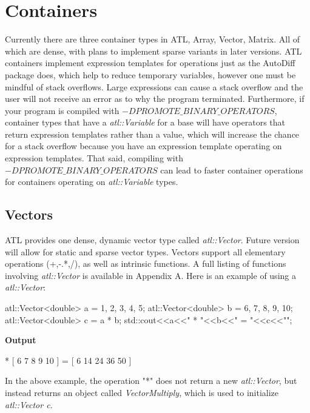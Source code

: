 \documentclass[12pt,a4paper]{article}
\begin{document}
\section{Containers}
Currently there are three container types in ATL, Array, Vector, Matrix. All of which are dense, with plans to implement sparse variants in later versions. ATL containers implement expression templates for operations just as the AutoDiff package does, which help to reduce temporary variables, however one must be mindful of stack overflows. Large expressions can cause a stack overflow and the user will not receive an error as to why the program terminated. Furthermore, if your program is compiled with \textit{$-DPROMOTE\_BINARY\_OPERATORS$}, container types that have a \textit{atl::Variable} for a base will have operators that return expression templates rather than a value, which will increase the chance for a stack overflow because you have an expression template operating on expression templates. That said, compiling with \textit{$-DPROMOTE\_BINARY\_OPERATORS$} can lead to faster container operations for containers operating on \textit{atl::Variable} types.
\subsection{Vectors}
ATL provides one dense, dynamic vector type called \textit{atl::Vector}. Future version will allow for static and sparse vector types. Vectors support all elementary operations (+,-.*,/), as well as intrinsic functions. A full listing of functions involving \textit{atl::Vector} is available in Appendix A. Here is an example of using a \textit{atl::Vector}:
\begin{cppsource}

    atl::Vector<double> a = {1, 2, 3, 4, 5};
    atl::Vector<double> b = {6, 7, 8, 9, 10};
    atl::Vector<double> c = a * b;
    std::cout<<a<<" * "<<b<<" = "<<c<<"\n";
  
\end{cppsource}
\textbf{Output}
\begin{myoutput}
[ 1 2 3 4 5 ] * [ 6 7 8 9 10 ] = [ 6 14 24 36 50 ]
\end{myoutput}
In the above example, the operation "*" does not return a new \textit{atl::Vector}, but instead returns an object called \textit{VectorMultiply}, which is used to initialize \textit{atl::Vector c}.
\end{document}
